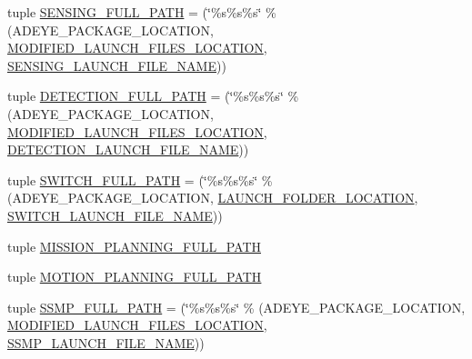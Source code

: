 \begin{DoxyCompactItemize}
\item 
tuple \hyperlink{namespacerp__manager_af912fb7c706707b4b2a06ba4cf4a5d24}{S\+E\+N\+S\+I\+N\+G\+\_\+\+F\+U\+L\+L\+\_\+\+P\+A\+TH} = (\char`\"{}\%s\%s\%s\char`\"{} \% (A\+D\+E\+Y\+E\+\_\+\+P\+A\+C\+K\+A\+G\+E\+\_\+\+L\+O\+C\+A\+T\+I\+ON, \hyperlink{namespacerp__manager_a43208312336e22fa0f9a976a69e1519e}{M\+O\+D\+I\+F\+I\+E\+D\+\_\+\+L\+A\+U\+N\+C\+H\+\_\+\+F\+I\+L\+E\+S\+\_\+\+L\+O\+C\+A\+T\+I\+ON}, \hyperlink{namespacerp__manager_a4b5be1d16a3c9ba81e23daa96404fcaa}{S\+E\+N\+S\+I\+N\+G\+\_\+\+L\+A\+U\+N\+C\+H\+\_\+\+F\+I\+L\+E\+\_\+\+N\+A\+ME}))
\item 
tuple \hyperlink{namespacerp__manager_a70fad5203ba45cd0085ee33158b164be}{D\+E\+T\+E\+C\+T\+I\+O\+N\+\_\+\+F\+U\+L\+L\+\_\+\+P\+A\+TH} = (\char`\"{}\%s\%s\%s\char`\"{} \% (A\+D\+E\+Y\+E\+\_\+\+P\+A\+C\+K\+A\+G\+E\+\_\+\+L\+O\+C\+A\+T\+I\+ON, \hyperlink{namespacerp__manager_a43208312336e22fa0f9a976a69e1519e}{M\+O\+D\+I\+F\+I\+E\+D\+\_\+\+L\+A\+U\+N\+C\+H\+\_\+\+F\+I\+L\+E\+S\+\_\+\+L\+O\+C\+A\+T\+I\+ON}, \hyperlink{namespacerp__manager_abf958196458f1890b8b9077998975e2e}{D\+E\+T\+E\+C\+T\+I\+O\+N\+\_\+\+L\+A\+U\+N\+C\+H\+\_\+\+F\+I\+L\+E\+\_\+\+N\+A\+ME}))
\item 
tuple \hyperlink{namespacerp__manager_a98789269c0bde80d85d5c62af5133062}{S\+W\+I\+T\+C\+H\+\_\+\+F\+U\+L\+L\+\_\+\+P\+A\+TH} = (\char`\"{}\%s\%s\%s\char`\"{} \% (A\+D\+E\+Y\+E\+\_\+\+P\+A\+C\+K\+A\+G\+E\+\_\+\+L\+O\+C\+A\+T\+I\+ON, \hyperlink{namespacerp__manager_af0ff9dba303cc42af7c94b91bd577a4f}{L\+A\+U\+N\+C\+H\+\_\+\+F\+O\+L\+D\+E\+R\+\_\+\+L\+O\+C\+A\+T\+I\+ON}, \hyperlink{namespacerp__manager_afa1029c78f6d8652ba47f268602aacf4}{S\+W\+I\+T\+C\+H\+\_\+\+L\+A\+U\+N\+C\+H\+\_\+\+F\+I\+L\+E\+\_\+\+N\+A\+ME}))
\item 
tuple \hyperlink{namespacerp__manager_a09c2ace0ccdb1ed70e1cb0b1a8997367}{M\+I\+S\+S\+I\+O\+N\+\_\+\+P\+L\+A\+N\+N\+I\+N\+G\+\_\+\+F\+U\+L\+L\+\_\+\+P\+A\+TH}
\item 
tuple \hyperlink{namespacerp__manager_abfcfbb274df96ce74ae7f446c5a23763}{M\+O\+T\+I\+O\+N\+\_\+\+P\+L\+A\+N\+N\+I\+N\+G\+\_\+\+F\+U\+L\+L\+\_\+\+P\+A\+TH}
\item 
tuple \hyperlink{namespacerp__manager_aa5f54d7effc05602e428d9d5829184c9}{S\+S\+M\+P\+\_\+\+F\+U\+L\+L\+\_\+\+P\+A\+TH} = (\char`\"{}\%s\%s\%s\char`\"{} \% (A\+D\+E\+Y\+E\+\_\+\+P\+A\+C\+K\+A\+G\+E\+\_\+\+L\+O\+C\+A\+T\+I\+ON, \hyperlink{namespacerp__manager_a43208312336e22fa0f9a976a69e1519e}{M\+O\+D\+I\+F\+I\+E\+D\+\_\+\+L\+A\+U\+N\+C\+H\+\_\+\+F\+I\+L\+E\+S\+\_\+\+L\+O\+C\+A\+T\+I\+ON}, \hyperlink{namespacerp__manager_addd21ac261b0a72d27fa7b982ba438c6}{S\+S\+M\+P\+\_\+\+L\+A\+U\+N\+C\+H\+\_\+\+F\+I\+L\+E\+\_\+\+N\+A\+ME}))

\end{DoxyCompactItemize}
